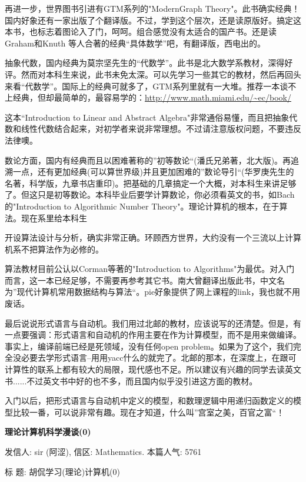 再进一步，世界图书引进有GTM系列的"ModernGraph Theory"。此书确实经典！国内好象还有一家出版了个翻译版。不过，学到这个层次，还是读原版好。搞定这本书，也标志着图论入了门，呵呵。组合感觉没有太适合的国产书。还是读Graham和Knuth 等人合著的经典“具体数学”吧，有翻译版，西电出的。 

抽象代数，国内经典为莫宗坚先生的“代数学”。此书是北大数学系教材，深得好评。然而对本科生来说，此书未免太深。可以先学习一些其它的教材，然后再回头来看“代数学”。国际上的经典可就多了，GTM系列里就有一大堆。推荐一本谈不上经典，但却最简单的，最容易学的：\href{http://www.math.miami.edu/~ec/book/}{http://www.math.miami.edu/\~{}ec/book/}

这本“Introduction to Linear and Abstract Algebra"非常通俗易懂，而且把抽象代数和线性代数结合起来，对初学者来说非常理想。不过请注意版权问题，不要违反法律噢。 

数论方面，国内有经典而且以困难著称的”初等数论“(潘氏兄弟著，北大版)。再追溯一点，还有更加经典(可以算世界级)并且更加困难的”数论导引“(华罗庚先生的名著，科学版，九章书店重印)。把基础的几章搞定一个大概，对本科生来讲足够了。但这只是初等数论。本科毕业后要学计算数论，你必须看英文的书，如Bach的"Introduction to Algorithmic Number Theory"。理论计算机的根本，在于算法。现在系里给本科生 

开设算法设计与分析，确实非常正确。环顾西方世界，大约没有一个三流以上计算机系不把算法作为必修的。 

算法教材目前公认以Corman等著的"Introduction to Algorithms"为最优。对入门而言，这一本已经足够，不需要再参考其它书。南大曾翻译出版此书，中文名为”现代计算机常用数据结构与算法“。pie好象提供了网上课程的link，我也就不用废话。 

最后说说形式语言与自动机。我们用过北邮的教材，应该说写的还清楚。但是，有一点要强调：形式语言和自动机的作用主要在作为计算模型，而不是用来做编译。事实上，编译前端已经是死领域，没有任何open problem。如果为了这个，我们完全没必要去学形式语言--用用yacc什么的就完了。北邮的那本，在深度上，在跟可计算性的联系上都有较大的局限，现代感也不足。所以建议有兴趣的同学去读英文书......不过英文书中好的也不多，而且国内似乎没引进这方面的教材。 

入门以后，把形式语言与自动机中定义的模型，和数理逻辑中用递归函数定义的模型比较一番，可以说非常有趣。现在才知道，什么叫”宫室之美，百官之富“！ 





\textbf{理论计算机科学漫谈(0)}

发信人: sir (阿涩), 信区: Mathematics. 本篇人气: 5761

标  题: 胡侃学习(理论)计算机(0)\cite{sir0}

